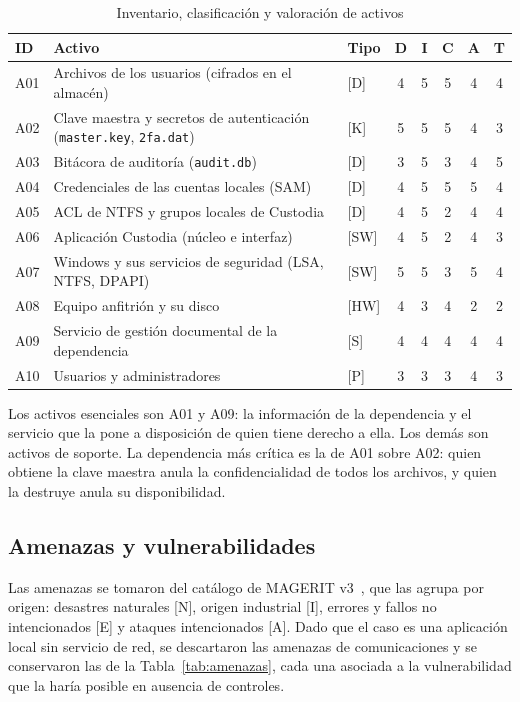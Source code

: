 \documentclass[conference]{IEEEtran}
\begin{document}
\begin{table}[!htb]
\caption{Inventario, clasificación y valoración de activos}
\label{tab:activos}
\centering
\footnotesize
\setlength{\tabcolsep}{3pt}
\begin{tabular}{|l|p{3.7cm}|l|c|c|c|c|c|}
\hline
\textbf{ID} & \textbf{Activo} & \textbf{Tipo} & \textbf{D} & \textbf{I} & \textbf{C} & \textbf{A} & \textbf{T} \\
\hline
A01 & Archivos de los usuarios (cifrados en el almacén) & [D] & 4 & 5 & 5 & 4 & 4 \\
\hline
A02 & Clave maestra y secretos de autenticación (\texttt{master.key}, \texttt{2fa.dat}) & [K] & 5 & 5 & 5 & 4 & 3 \\
\hline
A03 & Bitácora de auditoría (\texttt{audit.db}) & [D] & 3 & 5 & 3 & 4 & 5 \\
\hline
A04 & Credenciales de las cuentas locales (SAM) & [D] & 4 & 5 & 5 & 5 & 4 \\
\hline
A05 & ACL de NTFS y grupos locales de Custodia & [D] & 4 & 5 & 2 & 4 & 4 \\
\hline
A06 & Aplicación Custodia (núcleo e interfaz) & [SW] & 4 & 5 & 2 & 4 & 3 \\
\hline
A07 & Windows y sus servicios de seguridad (LSA, NTFS, DPAPI) & [SW] & 5 & 5 & 3 & 5 & 4 \\
\hline
A08 & Equipo anfitrión y su disco & [HW] & 4 & 3 & 4 & 2 & 2 \\
\hline
A09 & Servicio de gestión documental de la dependencia & [S] & 4 & 4 & 4 & 4 & 4 \\
\hline
A10 & Usuarios y administradores & [P] & 3 & 3 & 3 & 4 & 3 \\
\hline
\end{tabular}
\end{table}

Los activos esenciales son A01 y A09: la información de la dependencia y el servicio que la pone a disposición de quien tiene derecho a ella. Los demás son activos de soporte. La dependencia más crítica es la de A01 sobre A02: quien obtiene la clave maestra anula la confidencialidad de todos los archivos, y quien la destruye anula su disponibilidad.

\subsection{Amenazas y vulnerabilidades}
Las amenazas se tomaron del catálogo de MAGERIT v3~\cite{magerit2}, que las agrupa por origen: desastres naturales [N], origen industrial [I], errores y fallos no intencionados [E] y ataques intencionados [A]. Dado que el caso es una aplicación local sin servicio de red, se descartaron las amenazas de comunicaciones y se conservaron las de la Tabla~\ref{tab:amenazas}, cada una asociada a la vulnerabilidad que la haría posible en ausencia de controles.
\end{document}
